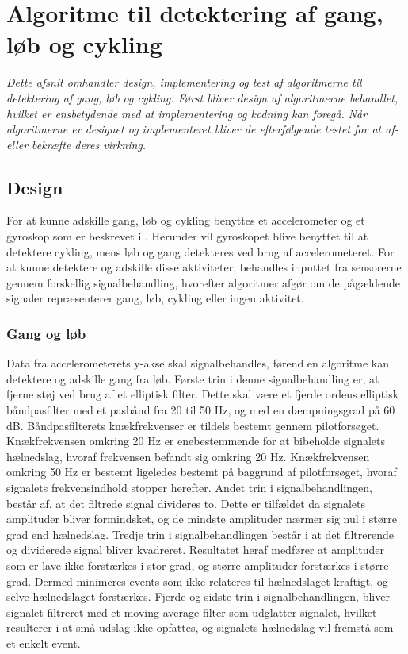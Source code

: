 \section{Algoritme til detektering af gang, løb og cykling}
\textit{Dette afsnit omhandler design, implementering og test af algoritmerne til detektering af gang, løb og cykling. Først bliver design af algoritmerne behandlet, hvilket er ensbetydende med at implementering og kodning kan foregå. Når algoritmerne er designet og implementeret bliver de efterfølgende testet for at af- eller bekræfte deres virkning.}

\subsection{Design}
For at kunne adskille gang, løb og cykling benyttes et accelerometer og et gyroskop som er beskrevet i . Herunder vil gyroskopet blive benyttet til at detektere cykling, mens løb og gang detekteres ved brug af accelerometeret. For at kunne detektere og adskille disse aktiviteter, behandles inputtet fra sensorerne gennem forskellig signalbehandling, hvorefter algoritmer afgør om de pågældende signaler repræsenterer gang, løb, cykling eller ingen aktivitet. 


\subsubsection{Gang og løb}
Data fra accelerometerets y-akse skal signalbehandles, førend en algoritme kan detektere og adskille gang fra løb. Første trin i denne signalbehandling er, at fjerne støj ved brug af et elliptisk filter. Dette skal være et fjerde ordens elliptisk båndpasfilter med et pasbånd fra 20 til 50 Hz, og med en dæmpningsgrad på 60 dB. Båndpasfilterets knækfrekvenser er tildels bestemt gennem pilotforsøget. Knækfrekvensen omkring 20 Hz er enebestemmende for at bibeholde signalets hælnedslag, hvoraf frekvensen befandt sig omkring 20 Hz. Knækfrekvensen omkring 50 Hz er bestemt ligeledes bestemt på baggrund af pilotforsøget, hvoraf signalets frekvensindhold stopper herefter. Andet trin i signalbehandlingen, består af, at det filtrede signal divideres to. Dette er tilfældet da signalets amplituder bliver formindsket, og de mindste amplituder nærmer sig nul i større grad end hælnedslag. Tredje trin i signalbehandlingen består i at det filtrerende og dividerede signal bliver kvadreret. Resultatet heraf medfører at amplituder som er lave ikke forstærkes i stor grad, og større amplituder forstærkes i større grad. Dermed minimeres events som ikke relateres til hælnedslaget kraftigt, og selve hælnedslaget forstærkes. Fjerde og sidste trin i signalbehandlingen, bliver signalet filtreret med et moving average filter som udglatter signalet, hvilket resulterer i at små udslag ikke opfattes, og signalets hælnedslag vil fremstå som et enkelt event. \\

